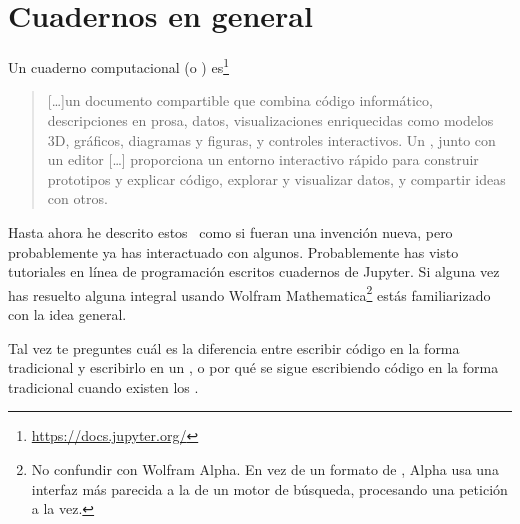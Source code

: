 \section{Cuadernos en general}

Un cuaderno computacional (o \notebook) es\footnote{
  \url{https://docs.jupyter.org/}
}
\blockquote{
  [\ldots]un documento compartible que combina código informático,
  descripciones en prosa, datos, visualizaciones enriquecidas como modelos 3D,
  gráficos, diagramas y figuras, y controles interactivos.
  Un \notebook, junto con un editor [\ldots] proporciona un entorno interactivo rápido
  para construir prototipos y explicar código, explorar y visualizar datos, y compartir
  ideas con otros.
}
Hasta ahora he descrito estos \notebooks~como si fueran una invención nueva,
pero probablemente ya has interactuado con algunos.
Probablemente has visto tutoriales en línea de programación escritos cuadernos de Jupyter.
Si alguna vez has resuelto alguna integral usando Wolfram Mathematica\footnote{
  No confundir con Wolfram Alpha. En vez de un formato de \notebook, Alpha usa una interfaz
  más parecida a la de un motor de búsqueda, procesando una petición a la vez.
} estás familiarizado con la idea general.

Tal vez te preguntes cuál es la diferencia entre escribir código en la forma tradicional
y escribirlo en un \notebook, o por qué se sigue escribiendo código en la forma tradicional
cuando existen los \notebooks.

